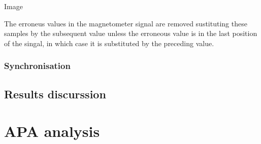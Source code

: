 Image

The erroneus values in the magnetometer signal are removed sustituting these samples by the subsequent value unless the erroneous value is in the last position of the singal, in which case it is substituted by the preceding value.

\subsubsection{Synchronisation}	
\subsection{Results discurssion}


\section{APA analysis}

